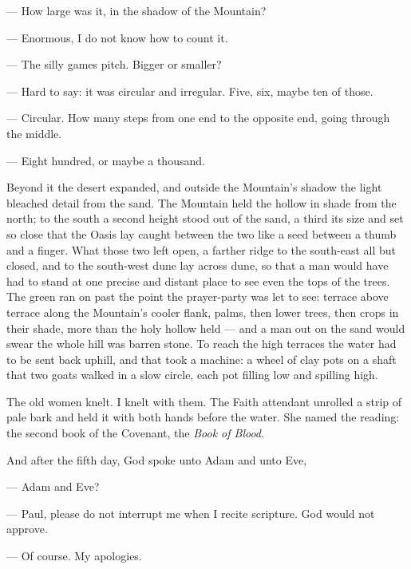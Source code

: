 \begin{room}

--- How large was it, in the shadow of the Mountain?

--- Enormous, I do not know how to count it.

--- The silly games pitch. Bigger or smaller?

--- Hard to say: it was circular and irregular. Five, six, maybe ten of those.

--- Circular. How many steps from one end to the opposite end, going through the middle.

--- Eight hundred, or maybe a thousand.

\end{room}

Beyond it the desert expanded, and outside the Mountain's shadow the light bleached detail from the sand. The Mountain held the hollow in shade from the north; to the south a second height stood out of the sand, a third its size and set so close that the Oasis lay caught between the two like a seed between a thumb and a finger. What those two left open, a farther ridge to the south-east all but closed, and to the south-west dune lay across dune, so that a man would have had to stand at one precise and distant place to see even the tops of the trees. The green ran on past the point the prayer-party was let to see: terrace above terrace along the Mountain's cooler flank, palms, then lower trees, then crops in their shade, more than the holy hollow held --- and a man out on the sand would swear the whole hill was barren stone. To reach the high terraces the water had to be sent back uphill, and that took a machine: a wheel of clay pots on a shaft that two goats walked in a slow circle, each pot filling low and spilling high.\par

The old women knelt. I knelt with them. The Faith attendant unrolled a strip of pale bark and held it with both hands before the water. She named the reading: the second book of the Covenant, the \textit{Book of Blood}.\par

\begin{scripture}
And after the fifth day, God spoke unto Adam and unto Eve,
\end{scripture}

\begin{room}
--- Adam and Eve?

--- Paul, please do not interrupt me when I recite scripture. God would not approve.

--- Of course. My apologies.
\end{room}

